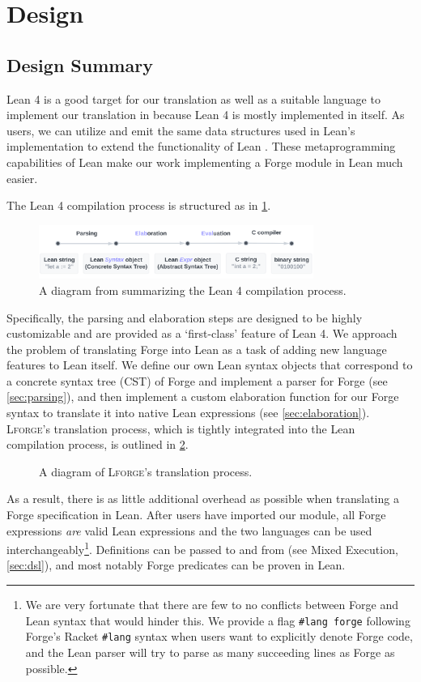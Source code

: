 \section{Design}
\subsection{Design Summary}\label{sec:design-summary}
Lean 4 is a good target for our translation as well as a suitable language to implement our translation in because Lean 4 is mostly implemented in itself. As users, we can utilize and emit the same data structures used in Lean's implementation to extend the functionality of Lean \cite{moura2021lean}. These metaprogramming capabilities of Lean make our work implementing a Forge module in Lean much easier. 

The Lean 4 compilation process is structured as in \cref{fig:lean-compilation}. 
\begin{figure}[h!]
\centering
\includegraphics[width=0.8\textwidth]{images/lean-compiler.png}
\caption{A diagram from \cite{metaprogramming} summarizing the Lean 4 compilation process.}
\label{fig:lean-compilation}
\end{figure}

Specifically, the parsing and elaboration steps are designed to be highly customizable and are provided as a `first-class' feature of Lean 4. We approach the problem of translating Forge into Lean as a task of adding new language features to Lean itself. We define our own Lean syntax objects that correspond to a concrete syntax tree (CST) of Forge and implement a parser for Forge (see \cref{sec:parsing}), and then implement a custom elaboration function for our Forge syntax to translate it into native Lean expressions (see \cref{sec:elaboration}). \textsc{Lforge}'s translation process, which is tightly integrated into the Lean compilation process, is outlined in \cref{fig:lforge-process}. 

\begin{figure}[h!]
\centering

\caption{A diagram of \textsc{Lforge}'s translation process.}
\label{fig:lforge-process}
\end{figure}  

As a result, there is as little additional overhead as possible when translating a Forge specification in Lean. After users have imported our module, all Forge expressions \emph{are} valid Lean expressions and the two languages can be used interchangeably\footnote{We are very fortunate that there are few to no conflicts between Forge and Lean syntax that would hinder this. We provide a flag \texttt{\#lang forge} following Forge's Racket \texttt{\#lang} syntax when users want to explicitly denote Forge code, and the Lean parser will try to parse as many succeeding lines as Forge as possible.}. Definitions can be passed to and from (see Mixed Execution, \cref{sec:dsl}), and most notably Forge predicates can be proven in Lean. 

